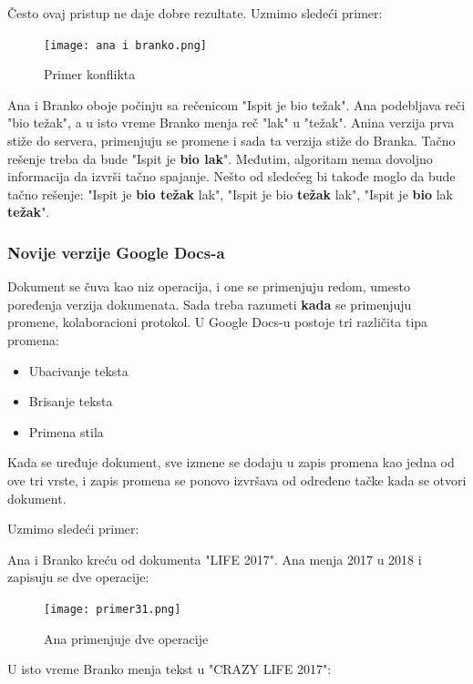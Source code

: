 \documentclass[12pt]{article}
\begin{document}
    Često ovaj pristup ne daje dobre rezultate. Uzmimo sledeći primer:

    \begin{figure}[h]
        \centering
        \texttt{[image: ana i branko.png]}
        \caption{Primer konflikta}
        \label{fig:nls_demo}
    \end{figure}

    Ana i Branko oboje počinju sa rečenicom "Ispit je bio težak". Ana podebljava reči "bio težak", a u isto vreme Branko menja reč "lak" u "težak". Anina verzija prva stiže do servera, primenjuju se promene i sada ta verzija stiže do Branka. Tačno rešenje treba da bude "Ispit je \textbf{bio lak}". Međutim, algoritam nema dovoljno informacija da izvrši tačno spajanje. Nešto od sledećeg bi takođe moglo da bude tačno rešenje: "Ispit je \textbf{bio težak} lak", "Ispit je bio \textbf{težak} lak", "Ispit je  \textbf{bio} lak \textbf{težak}".

    \subsubsection{Novije verzije Google Docs-a}

    Dokument se čuva kao niz operacija, i one se primenjuju redom, umesto poređenja verzija dokumenata. Sada treba razumeti \textbf{kada} se primenjuju promene, kolaboracioni protokol. U Google Docs-u postoje tri različita tipa promena:

    \begin{itemize}
        \item Ubacivanje teksta
        \item Brisanje teksta
        \item Primena stila
    \end{itemize}

    Kada se uređuje dokument, sve izmene se dodaju u zapis promena kao jedna od ove tri vrste, i zapis promena se ponovo izvršava od određene tačke kada se otvori dokument.

    Uzmimo sledeći primer:

    Ana i Branko kreću od dokumenta "LIFE 2017". Ana menja 2017 u 2018 i zapisuju se dve operacije:

    \begin{figure}[H]
        \centering
        \texttt{[image: primer31.png]}
        \caption{Ana primenjuje dve operacije}
        \label{fig:nls_demo}
    \end{figure}

    U isto vreme Branko menja tekst u "CRAZY LIFE 2017":
\end{document}
